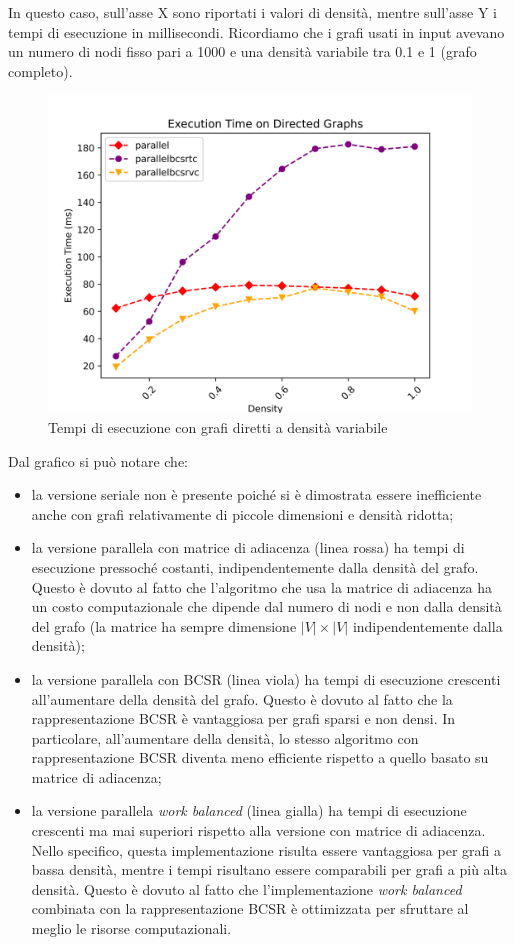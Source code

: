         In questo caso, sull'asse X sono riportati i valori di densità, mentre sull'asse Y i tempi di esecuzione in millisecondi. Ricordiamo che i grafi usati in input avevano un numero di nodi fisso pari a 1000 e una densità variabile tra 0.1 e 1 (grafo completo).

        \begin{figure}
            \centering
            \includegraphics[width=0.7\linewidth]{images/execution_time_density.png}
            \caption{Tempi di esecuzione con grafi diretti a densità variabile}
            \label{fig:exec-time-density}
        \end{figure}

        Dal grafico si può notare che:
        \begin{itemize}
            \item la versione seriale non è presente poiché si è dimostrata essere inefficiente anche con grafi relativamente di piccole dimensioni e densità ridotta;
            \item la versione parallela con matrice di adiacenza (linea rossa) ha tempi di esecuzione pressoché costanti, indipendentemente dalla densità del grafo. Questo è dovuto al fatto che l'algoritmo che usa la matrice di adiacenza ha un costo computazionale che dipende dal numero di nodi e non dalla densità del grafo (la matrice ha sempre dimensione $|V| \times |V|$ indipendentemente dalla densità);
            \item la versione parallela con BCSR (linea viola) ha tempi di esecuzione crescenti all'aumentare della densità del grafo. Questo è dovuto al fatto che la rappresentazione BCSR è vantaggiosa per grafi sparsi e non densi. In particolare, all'aumentare della densità, lo stesso algoritmo con rappresentazione BCSR diventa meno efficiente rispetto a quello basato su matrice di adiacenza;
            \item la versione parallela \textit{work balanced} (linea gialla) ha tempi di esecuzione crescenti ma mai superiori rispetto alla versione con matrice di adiacenza. Nello specifico, questa implementazione risulta essere vantaggiosa per grafi a bassa densità, mentre i tempi risultano essere comparabili per grafi a più alta densità. Questo è dovuto al fatto che l'implementazione \textit{work balanced} combinata con la rappresentazione BCSR è ottimizzata per sfruttare al meglio le risorse computazionali.
        \end{itemize}

